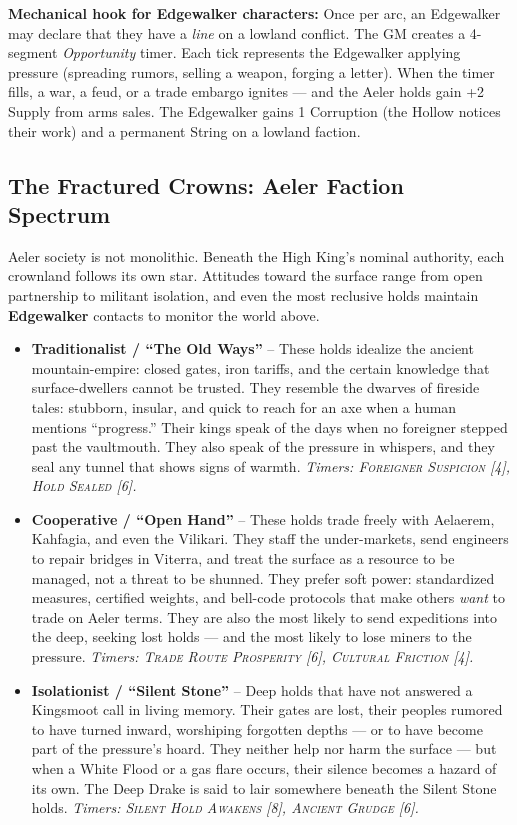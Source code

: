\textbf{Mechanical hook for Edgewalker characters:} Once per arc, an Edgewalker may declare that they have a \textit{line} on a lowland conflict. The GM creates a 4-segment \textit{Opportunity} timer. Each tick represents the Edgewalker applying pressure (spreading rumors, selling a weapon, forging a letter). When the timer fills, a war, a feud, or a trade embargo ignites --- and the Aeler holds gain +2 Supply from arms sales. The Edgewalker gains 1 Corruption (the Hollow notices their work) and a permanent String on a lowland faction.

\subsection*{The Fractured Crowns: Aeler Faction Spectrum}
Aeler society is not monolithic. Beneath the High King's nominal authority, each crownland follows its own star. Attitudes toward the surface range from open partnership to militant isolation, and even the most reclusive holds maintain \textbf{Edgewalker} contacts to monitor the world above.

\begin{itemize}[leftmargin=*]
    \item \textbf{Traditionalist / ``The Old Ways''} -- These holds idealize the ancient mountain-empire: closed gates, iron tariffs, and the certain knowledge that surface-dwellers cannot be trusted. They resemble the dwarves of fireside tales: stubborn, insular, and quick to reach for an axe when a human mentions ``progress.'' Their kings speak of the days when no foreigner stepped past the vaultmouth. They also speak of the pressure in whispers, and they seal any tunnel that shows signs of warmth.  
    \emph{Timers: \textsc{Foreigner Suspicion} [4], \textsc{Hold Sealed} [6].}

    \item \textbf{Cooperative / ``Open Hand''} -- These holds trade freely with Aelaerem, Kahfagia, and even the Vilikari. They staff the under-markets, send engineers to repair bridges in Viterra, and treat the surface as a resource to be managed, not a threat to be shunned. They prefer soft power: standardized measures, certified weights, and bell-code protocols that make others \emph{want} to trade on Aeler terms. They are also the most likely to send expeditions into the deep, seeking lost holds --- and the most likely to lose miners to the pressure.  
    \emph{Timers: \textsc{Trade Route Prosperity} [6], \textsc{Cultural Friction} [4].}

    \item \textbf{Isolationist / ``Silent Stone''} -- Deep holds that have not answered a Kingsmoot call in living memory. Their gates are lost, their peoples rumored to have turned inward, worshiping forgotten depths --- or to have become part of the pressure's hoard. They neither help nor harm the surface --- but when a White Flood or a gas flare occurs, their silence becomes a hazard of its own. The Deep Drake is said to lair somewhere beneath the Silent Stone holds.  
    \emph{Timers: \textsc{Silent Hold Awakens} [8], \textsc{Ancient Grudge} [6].}
\end{itemize}

